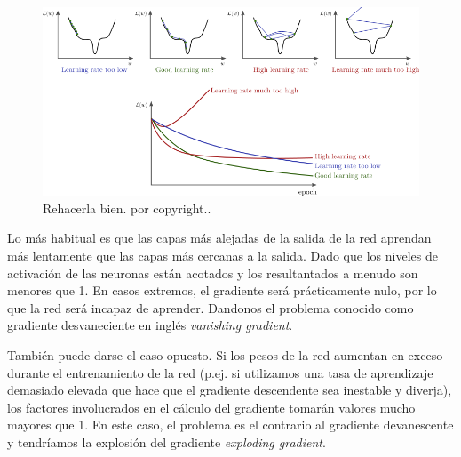 \begin{figure}[H]
 \centering
 \includegraphics[scale=0.5]{../Figuras/gradiente.png}
 \caption{Rehacerla bien. por copyright..}
 \label{fig:gradiente}
\end{figure}

Lo más habitual es que las capas más alejadas de la salida de la red aprendan más lentamente que las capas más cercanas a la salida. Dado que los niveles de activación de las neuronas están acotados y los resultantados a menudo son menores que 1. En casos extremos, el gradiente será prácticamente nulo, por lo que la red será incapaz de aprender. Dandonos el 
 problema conocido como gradiente desvaneciente en inglés \emph{vanishing gradient}.

 También puede darse el caso opuesto. Si los pesos de la red aumentan en exceso durante el entrenamiento de la red (p.ej. si utilizamos una tasa de aprendizaje demasiado elevada que hace que el gradiente descendente sea inestable y diverja), los factores involucrados en el cálculo del gradiente tomarán valores mucho mayores que 1. En este caso, el problema es el contrario al gradiente devanescente y tendríamos la explosión del gradiente \emph{exploding gradient}.

 \begin{center}
\end{center}

